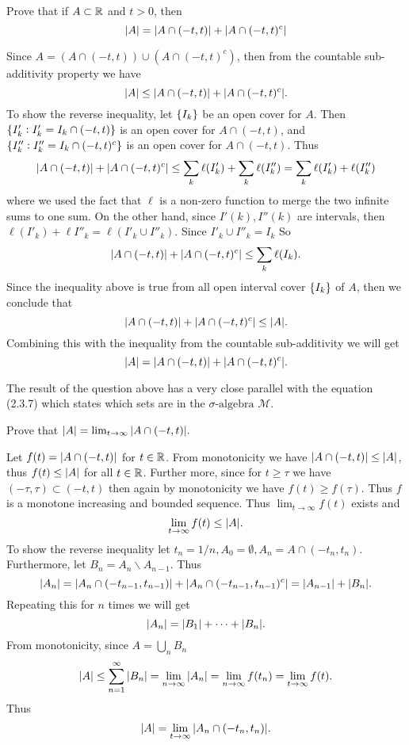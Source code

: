 \begin{problem}
	Prove that if $ A\subset \mathbb{R} $ and $ t > 0 $, then
	\[  |A| = |A\cap (-t,t)| + |A \cap (-t,t)^c|  \]
\end{problem}
\begin{solution}
	Since $ A =( A \cap (-t,t) ) \cup (A \cap (-t,t)^c) $, then from the countable sub-additivity property we have
	\[ |A| \leq |A \cap (-t,t) | + |A \cap (-t,t)^c|. \]
	To show the reverse inequality, let $ \{I_k\} $ be an open cover for $ A $. Then $ \{I'_k: I'_k =  I_k \cap (-t,t)\} $ is an open cover for $ A \cap (-t,t) $, and $ \{I''_k: I''_k = I_k \cap (-t,t)^c\} $ is an open cover for $ A\cap (-t,t) $. Thus 
	\[ |A \cap (-t,t)| + |A \cap (-t,t)^c| \leq \sum_k \ell(I'_k) + \sum_k \ell(I''_k) = \sum_k \ell(I'_k) + \ell(I''_k)  \]
	where we used the fact that $ \ell $ is a non-zero function to merge the two infinite sums to one sum. On the other hand, since $ I'(k) , I''(k)$ are intervals, then $ \ell(I'_k) + \ell{I''_k} = \ell(I'_k \cup I''_k) $. Since $ I'_k \cup I''_k = I_k $
	So
	\[ |A \cap (-t,t)| + |A \cap (-t,t)^c| \leq \sum_k \ell(I_k). \]
	Since the inequality above is true from all open interval cover $ \{I_k\} $ of $  A $, then we conclude that 
	\[ |A \cap (-t,t)| + |A \cap (-t,t)^c| \leq |A|. \]
	Combining this with the inequality from the countable sub-additivity we will get
	\[ |A| = |A\cap (-t,t)| + |A \cap (-t,t)^c|. \]
\end{solution}
\begin{observation}
	The result of the question above has a very close parallel with the equation (2.3.7) which states which sets are in the $ \sigma\text{-algebra} $ $ \mathcal{M} $.
\end{observation}

\begin{problem}
	Prove that $ |A| = \lim_{t\to \infty} |A \cap (-t,t)|. $
\end{problem}
\begin{solution}
	Let $ f(t) = |A \cap (-t,t)| $ for $ t\in \mathbb{R} $. From monotonicity we have $ |A \cap (-t,t)| \leq |A| $, thus $ f(t) \leq |A| $ for all $ t \in \mathbb{R} $. Further more, since for $ t \geq \tau $ we have  $ (-\tau,\tau) \subset (-t,t) $ then again by monotonicity we have $ f(t) \geq f(\tau) $. Thus $ f $ is a monotone increasing and bounded sequence. Thus $ \lim_{t\to\infty} f(t)$ exists and 
	\[ \lim_{t\to\infty}f(t) \leq |A|. \]
	To show the reverse inequality let $ t_n = 1/n, A_0 = \emptyset, A_n = A \cap (-t_n, t_n) $. Furthermore, let $ B_n = A_n \backslash A_{n-1} $. Thus
	\[ |A_n| = |A_n \cap (-t_{n-1},t_{n-1})| + |A_n \cap (-t_{n-1},t_{n-1})^c| = |A_{n-1}| + |B_n|. \]
	Repeating this for $ n $ times we will get
	\[ |A_n| = |B_1| + \cdots + |B_n|. \]
	From monotonicity, since $ A = \bigcup_n B_n $
	\[ |A| \leq \sum_{n=1}^\infty |B_n| = \lim_{n\to\infty}|A_n| = \lim_{n\to\infty}f(t_n)  = \lim_{t\to\infty}f(t).\]
	Thus
	\[ |A| = \lim_{t\to\infty}|A_n \cap (-t_n, t_n)|. \]
\end{solution}


